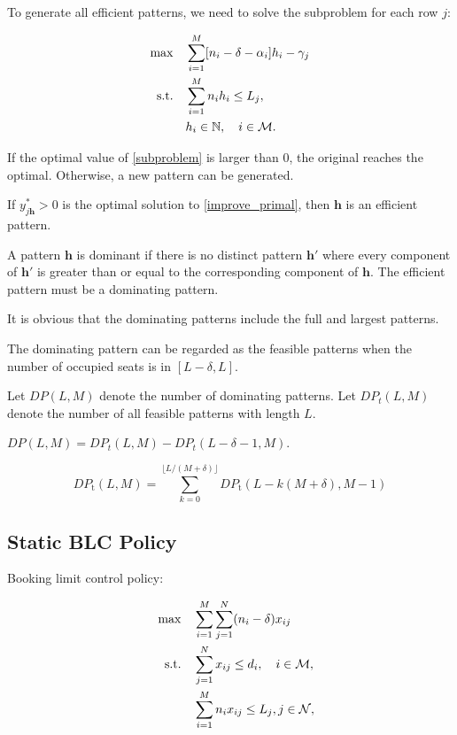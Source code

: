 To generate all efficient patterns, we need to solve the subproblem for each row $j$:

\begin{align}\label{subproblem}
    \max \quad & \sum_{i=1}^{M} [n_i - \delta - \alpha_{i}] h_{i} - \gamma_{j} \\
    \text {s.t.} \quad & \sum_{i= 1}^{M} n_{i} h_{i} \leq L_j, \notag \\
    & h_{i} \in \mathbb{N}, \quad i \in \mathcal{M}. \notag
\end{align} 

If the optimal value of \eqref{subproblem} is larger than $0$, the original reaches the optimal. Otherwise, a new pattern can be generated.

\begin{lem}
    If $y_{j \bm{h}}^{*} > 0$ is the optimal solution to \eqref{improve_primal}, then $\bm{h}$ is an efficient pattern.
\end{lem}


A pattern $\bm{h}$ is dominant if there is no distinct pattern $\bm{h}{'}$ where every component of $\bm{h}{'}$ is greater than or equal to the corresponding component of $\bm{h}$. The efficient pattern must be a dominating pattern. 

It is obvious that the dominating patterns include the full and largest patterns.

The dominating pattern can be regarded as the feasible patterns when the number of occupied seats is in $[L-\delta, L]$.

Let $DP(L, M)$ denote the number of dominating patterns. Let $DP_{t} (L, M)$ denote the number of all feasible patterns with length $L$.

$DP(L, M) = DP_{t} (L, M) - DP_{t} (L-\delta-1, M)$.

\begin{equation}
DP_{\text {t}}(L, M)=\sum_{k=0}^{\lfloor L /(M+\delta)\rfloor} D P_{\text {t}}(L-k(M+\delta), M-1)
\end{equation}


\newpage

\subsection{Static BLC Policy}
Booking limit control policy:

\begin{align}
    \quad \max \quad & \sum_{i=1}^{M}  \sum_{j= 1}^{N} (n_i - \delta) x_{ij} \label{theta_deter} \\
    \text {s.t.} \quad & \sum_{j= 1}^{N} x_{ij} \leq d_{i}, \quad i \in \mathcal{M}, \notag \\ 
    & \sum_{i=1}^{M} n_{i} x_{ij} \leq L_j, j \in \mathcal{N}, \notag 
\end{align}

